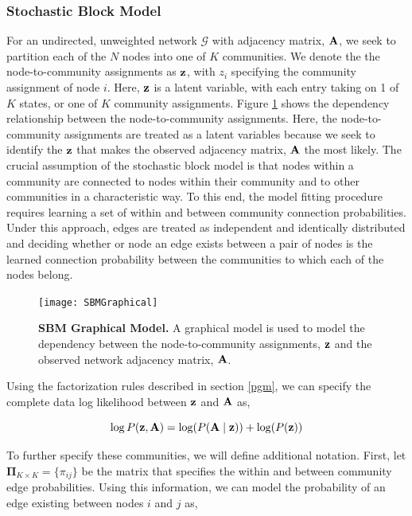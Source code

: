 \subsubsection{Stochastic Block Model}
For an undirected, unweighted network $\mathcal{G}$ with adjacency matrix, ${\bf A}$, we seek to partition each of the $N$ nodes into one of $K$ communities. We denote the the node-to-community assignments as ${\bf z}$, with $z_{i}$ specifying the community assignment of node $i$. Here, ${\bf z}$ is a latent variable, with each entry taking on 1 of $K$ states, or one of $K$ community assignments. Figure \ref{fig:graphical} shows the dependency relationship between the node-to-community assignments. Here, the node-to-community assignments are treated as a latent variables because we seek to identify the ${\bf z}$ that makes the observed adjacency matrix, ${\bf A}$ the most likely.  The crucial assumption of the stochastic block model is that nodes within a community are connected to nodes within their community and to other communities in a characteristic way. To this end, the model fitting procedure requires learning a set of within and between community connection probabilities. Under this approach, edges are treated as independent and identically distributed and deciding whether or node an edge exists between a pair of nodes is the learned connection probability between the communities to which each of the nodes belong.

\begin{figure}
\begin{center}
\texttt{[image: SBMGraphical]}
\caption{{\bf SBM Graphical Model.} A graphical model is used to model the dependency between the node-to-community assignments, ${\bf z}$ and the observed network adjacency matrix, ${\bf A}$.}
\label{fig:graphical}
\end{center}
\end{figure}

Using the factorization rules described in section \ref{pgm}, we can specify the complete data log likelihood between ${\bf z}$ and ${\bf A}$ as,

\begin{equation}
\log P({\bf z},{\bf A})=\log(P({\bf A} \mid {\bf z}))+\log(P({\bf z}))
\end{equation}

To further specify these communities, we will define additional notation. First, let ${\boldsymbol \Pi}_{K \times K}=\{\pi_{ij}\}$ be the matrix that specifies the within and between community edge probabilities. Using this information, we can model the probability of an edge existing between nodes $i$ and $j$ as,

